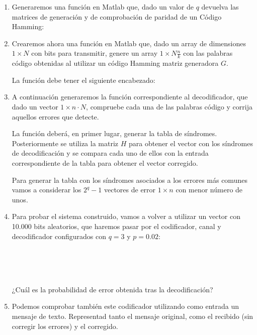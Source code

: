 \documentclass[es,practica]{uah}
\begin{document}
	\begin{enumerate}
	
		\item \textrm{Generaremos una función en Matlab que, dado un valor de $q$ devuelva las matrices de generación y de comprobación de paridad de un Código Hamming:}
		
		
	
		\item \textrm{Crearemos ahora una función en Matlab que, dado un array de dimensiones $1 \times N$ con bits para transmitir, genere un array $1 \times N \frac{n}{k}$ con las palabras código obtenidas al utilizar un código Hamming matriz generadora $G$.}
	
			\textrm{La función debe tener el siguiente encabezado:}
			
	
	
		\item \textrm{A continuación generaremos la función correspondiente al decodificador, que dado un vector $1 \times n\cdot N$, compruebe cada una de las palabras código y corrija aquellos errores que detecte.}
		
				
			\textrm{La función deberá, en primer lugar, generar la tabla de síndromes. Posteriormente se utiliza la matriz $H$ para obtener el vector con los síndromes de decodificación y se compara cada uno de ellos con la entrada correspondiente de la tabla para obtener el vector corregido.}
			
			\textrm{Para generar la tabla con los síndromes asociados a los errores más comunes vamos a considerar los $2^q-1$ vectores de error $1 \times n$ con menor número de unos.}
			
		\item \textrm{Para probar el sistema construido, vamos a volver a utilizar un vector con 10.000 bits aleatorios, que haremos pasar por el codificador, canal y decodificador configurados con $q=3$ y $p=0.02$:}
		
				 \\
				\\
				\\
		
			\textrm{¿Cuál es la probabilidad de error obtenida tras la decodificación? }
			\item Podemos comprobar también este codificador utilizando como entrada un mensaje de texto. Representad tanto el mensaje original, como el recibido (sin corregir los errores) y el corregido. 
	\end{enumerate}
\end{document}
